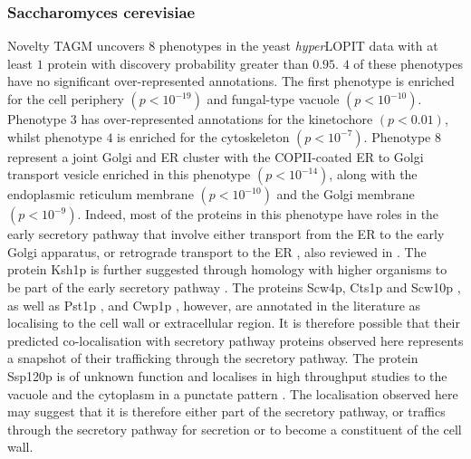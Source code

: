 \documentclass[12pt,english]{article}
\begin{document}
 \subsubsection{Saccharomyces cerevisiae}
Novelty TAGM uncovers $8$ phenotypes in the yeast \textit{hyper}LOPIT data with at least $1$ protein with discovery probability greater than $0.95$. $4$ of these phenotypes have no significant over-represented annotations. The first phenotype is enriched for the cell periphery $(p < 10^{-19})$ and fungal-type vacuole $(p < 10^{-10})$. Phenotype $3$ has over-represented annotations for the kinetochore $(p < 0.01)$, whilst phenotype $4$ is enriched for the cytoskeleton $(p < 10^{-7})$. Phenotype $8$ represent a joint Golgi and ER cluster with the COPII-coated ER to Golgi transport vesicle enriched in this phenotype $(p < 10^{-14})$, along with the endoplasmic reticulum membrane $(p < 10^{-10})$ and the Golgi membrane $(p < 10^{-9})$. Indeed, most of the proteins in this phenotype have roles in the early secretory pathway that involve either transport from the ER to the early Golgi apparatus, or retrograde transport to the ER \citep{Bue:2006,Inadome:2005, Otte:2001, Yofe:2016}, also reviewed in \citep{Delic:2013}. The protein Ksh1p is further suggested through homology with higher organisms to be part of the early secretory pathway \citep{Wendler:2010}. The proteins Scw4p, Cts1p and Scw10p \citep{Cappellaro:1998}, as well as Pst1p \citep{Pardo:2004}, and Cwp1p \citep{Yin:2005}, however, are annotated in the literature as localising to the cell wall or extracellular region. It is therefore possible that their predicted co-localisation with secretory pathway proteins observed here represents a snapshot of their trafficking through the secretory pathway. The protein Ssp120p is of unknown function and localises in high throughput studies to the vacuole \citep{Yofe:2016} and the cytoplasm in a punctate pattern \citep{Huh:2003}. The localisation observed here may suggest that it is therefore either part of the secretory pathway, or traffics through the secretory pathway for secretion or to become a constituent of the cell wall. 
 
\end{document}
